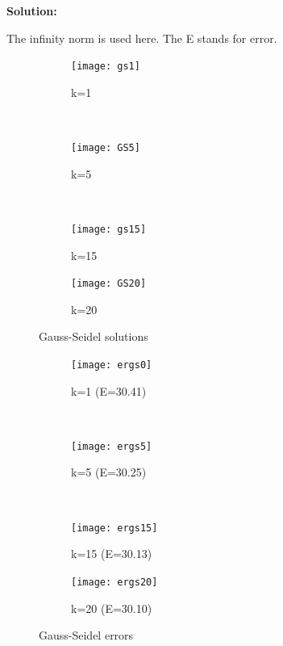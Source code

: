 \documentclass[letterpaper,12pt]{article}
\begin{document}
\begin{enumerate}
{\bf Solution:}

The infinity norm is used here. The E stands for error.
\begin{figure}[H]
    \centering
    \begin{subfigure}[b]{0.22\textwidth}
        \texttt{[image: gs1]}
        \caption{k=1}
        \label{fig:gull}
    \end{subfigure}
    ~ %
    \begin{subfigure}[b]{0.22\textwidth}
        \texttt{[image: GS5]}
        \caption{k=5}
        \label{fig:tiger}
    \end{subfigure}
    ~ %
    \begin{subfigure}[b]{0.22\textwidth}
        \texttt{[image: gs15]}
        \caption{k=15}
        \label{fig:mouse}
    \end{subfigure}
     \begin{subfigure}[b]{0.22\textwidth}
        \texttt{[image: GS20]}
        \caption{k=20}
        \label{fig:mouse}
    \end{subfigure}
    \caption{Gauss-Seidel solutions}\label{fig:animals}
\end{figure}
\begin{figure}[H]
    \centering
    \begin{subfigure}[b]{0.22\textwidth}
        \texttt{[image: ergs0]}
        \caption{k=1 (E=30.41)}
        \label{fig:gull}
    \end{subfigure}
    ~ %
    \begin{subfigure}[b]{0.22\textwidth}
        \texttt{[image: ergs5]}
        \caption{k=5 (E=30.25)}
        \label{fig:tiger}
    \end{subfigure}
    ~ %
    \begin{subfigure}[b]{0.22\textwidth}
        \texttt{[image: ergs15]}
        \caption{k=15 (E=30.13)}
        \label{fig:mouse}
    \end{subfigure}
     \begin{subfigure}[b]{0.22\textwidth}
        \texttt{[image: ergs20]}
        \caption{k=20 (E=30.10)}
        \label{fig:mouse}
    \end{subfigure}
    \caption{Gauss-Seidel errors}\label{fig:animals}
\end{figure}



\end{enumerate}
\end{document}
